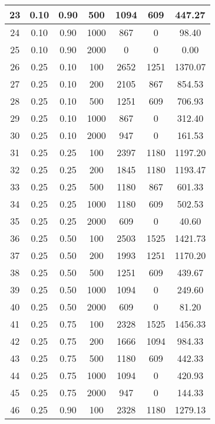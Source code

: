 \documentclass[a4paper, 12pt, unknownkeysallowed]{extreport}
\begin{document}
\begin{center}
\begin{longtable}[c]{|c|c|c|c|c|c|c|}
 23 & 0.10 & 0.90 &   500 & 1094 &  609 & 447.27 \\ \hline
 24 & 0.10 & 0.90 &  1000 &  867 &    0 & 98.40 \\ \hline
 25 & 0.10 & 0.90 &  2000 &    0 &    0 &  0.00 \\ \hline
 26 & 0.25 & 0.10 &   100 & 2652 & 1251 & 1370.07 \\ \hline
 27 & 0.25 & 0.10 &   200 & 2105 &  867 & 854.53 \\ \hline
 28 & 0.25 & 0.10 &   500 & 1251 &  609 & 706.93 \\ \hline
 29 & 0.25 & 0.10 &  1000 &  867 &    0 & 312.40 \\ \hline
 30 & 0.25 & 0.10 &  2000 &  947 &    0 & 161.53 \\ \hline
 31 & 0.25 & 0.25 &   100 & 2397 & 1180 & 1197.20 \\ \hline
 32 & 0.25 & 0.25 &   200 & 1845 & 1180 & 1193.47 \\ \hline
 33 & 0.25 & 0.25 &   500 & 1180 &  867 & 601.33 \\ \hline
 34 & 0.25 & 0.25 &  1000 & 1180 &  609 & 502.53 \\ \hline
 35 & 0.25 & 0.25 &  2000 &  609 &    0 & 40.60 \\ \hline
 36 & 0.25 & 0.50 &   100 & 2503 & 1525 & 1421.73 \\ \hline
 37 & 0.25 & 0.50 &   200 & 1993 & 1251 & 1170.20 \\ \hline
 38 & 0.25 & 0.50 &   500 & 1251 &  609 & 439.67 \\ \hline
 39 & 0.25 & 0.50 &  1000 & 1094 &    0 & 249.60 \\ \hline
 40 & 0.25 & 0.50 &  2000 &  609 &    0 & 81.20 \\ \hline
 41 & 0.25 & 0.75 &   100 & 2328 & 1525 & 1456.33 \\ \hline
 42 & 0.25 & 0.75 &   200 & 1666 & 1094 & 984.33 \\ \hline
 43 & 0.25 & 0.75 &   500 & 1180 &  609 & 442.33 \\ \hline
 44 & 0.25 & 0.75 &  1000 & 1094 &    0 & 420.93 \\ \hline
 45 & 0.25 & 0.75 &  2000 &  947 &    0 & 144.33 \\ \hline
 46 & 0.25 & 0.90 &   100 & 2328 & 1180 & 1279.13 \\ \hline
  \end{longtable}
\end{center}
\end{document}

